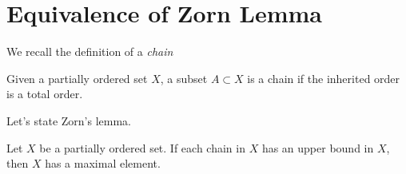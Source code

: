 





\iftrue
 
 
 
 
 
 
 
 
 
 
 
 
 
\else
 \setcounter{chapter}{4}  
 \setcounter{chapter}{9}  
 \setcounter{chapter}{10}  
\fi



\iffalse
\setcounter{chapter}{10}


\fi


\appendix
{}


\section{Equivalence of Zorn Lemma}

We recall the definition of a \emph{chain}

Given a partially ordered set $X$, a subset \(A\subset X\) is a chain
if the inherited order is a total order.

Let's state Zorn's lemma.
\begin{llem}
Let $X$ be a partially ordered set. If each chain in $X$ has an upper bound
in $X$, then $X$ has a maximal element.
\end{llem}

